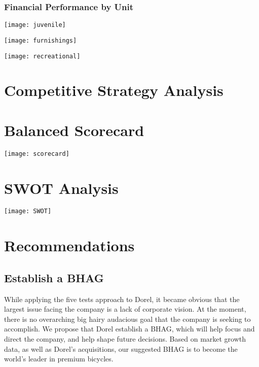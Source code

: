 {\pagebreak
\subsection {Financial Performance by Unit}
\centerline{\texttt{[image: juvenile]}}
\centerline{\texttt{[image: furnishings]}}
\centerline{\texttt{[image: recreational]}}




\chapter{Competitive Strategy Analysis}








\chapter{Balanced Scorecard}
\label{chp:scorecard}
\centerline{\texttt{[image: scorecard]}}

\chapter{SWOT Analysis}
\label{chp:swot}
\centerline{\texttt{[image: SWOT]}}

\chapter{Recommendations}
\label{chp:recommendations}
\section{Establish a BHAG}
While applying the five tests approach to Dorel, it became obvious that the largest issue facing the company is a lack of corporate vision.  At the moment, there is no overarching big hairy audacious goal that the company is seeking to accomplish.  We propose that Dorel establish a BHAG, which will help focus and direct the company, and help shape future decisions.  Based on market growth data, as well as Dorel's acquisitions, our suggested BHAG is to become the world's leader in premium bicycles.  

}
